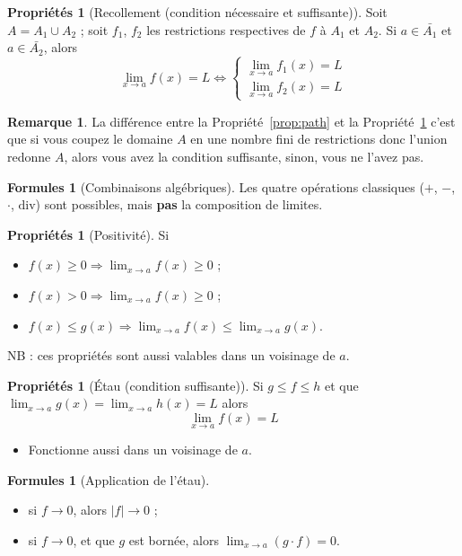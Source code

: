 \documentclass[11pt,a4paper]{article}
\theoremstyle{definition}
\newtheorem{myprop}[mydef]{Propriétés}
\newtheorem{myrem}[mydef]{Remarque}
\newtheorem{myform}[mydef]{Formules}
\renewcommand{\div}{\mathrm{div}}
\newcommand*\InsertTheoremBreak{%
	\begingroup %
		\setlength\itemsep{0pt}%
		\setlength\parsep{0pt}%
		\item[\vbox{\null}]%
	\endgroup%
}%
\begin{document}
\begin{myprop}[Recollement (condition nécessaire et suffisante)]
	\label{prop:rec}
	Soit $A = A_1 \cup A_2$ ; soit $f_1$, $f_2$ les restrictions respectives de $f$ à $A_1$ et $A_2$. Si $a \in \bar{A_1}$ et $a \in \bar{A_2}$, alors
	\[ \lim_{x \to a}f(x) = L \Leftrightarrow \left\{
	\begin{array}{l}
		\lim_{x \to a} f_1(x) = L \\
		\lim_{x \to a}f_2(x) = L
	\end{array} \right. \]
\end{myprop}

\begin{myrem}
	La différence entre la Propriété~\ref{prop:path} et la Propriété~\ref{prop:rec} c'est que
	si vous coupez le domaine $A$ en une nombre fini de restrictions donc l'union redonne $A$,
	alors vous avez la condition suffisante, sinon, vous ne l'avez pas.
\end{myrem}

\begin{myform}[Combinaisons algébriques]
	Les quatre opérations classiques ($+$, $-$, $\cdot$, $\div$) sont possibles, mais \textbf{pas} la composition de limites.
\end{myform}

\begin{myprop}[Positivité] Si
	\begin{itemize}
		\item $f(x) \geq 0 \Rightarrow \lim_{x \to a} f(x) \geq 0$ ;
		\item $f(x) > 0 \Rightarrow \lim_{x \to a} f(x) \geq 0$ ;
		\item $f(x) \leq g(x) \Rightarrow \lim_{x \to a} f(x) \leq \lim_{x \to a} g(x)$.
	\end{itemize}
	NB : ces propriétés sont aussi valables dans un voisinage de $a$.
\end{myprop}

\begin{myprop}[Étau (condition suffisante)]
	Si $g \leq f \leq h$ et que $\lim_{x \to a} g(x) = \lim_{x \to a} h(x) = L$ alors
	\[ \lim_{x \to a} f(x) = L \]
	\begin{itemize}
		\item Fonctionne aussi dans un voisinage de $a$.
	\end{itemize}
\end{myprop}

\begin{myform}[Application de l'étau]\InsertTheoremBreak
	\begin{itemize}
		\item si $f \rightarrow 0$, alors $|f| \rightarrow 0$ ;
		\item si $f \to 0$, et que $g$ est bornée, alors $\lim_{x \to a} (g \cdot f) = 0$.
	\end{itemize}
\end{myform}
\end{document}
